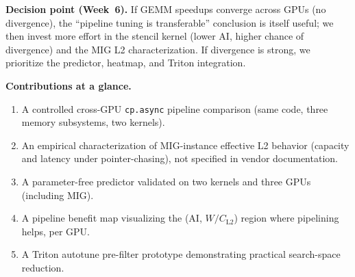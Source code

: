 \documentclass[sigplan,nonacm,10pt]{acmart}
\begin{document}
\smallskip
\noindent\textbf{Decision point (Week~6).}
If GEMM speedups converge across GPUs (no divergence), the
``pipeline tuning is transferable'' conclusion is itself useful; we
then invest more effort in the stencil kernel (lower AI, higher chance
of divergence) and the MIG L2 characterization.
If divergence is strong, we prioritize the predictor, heatmap, and
Triton integration.

\smallskip
\noindent\textbf{Contributions at a glance.}
\begin{enumerate}
\item A controlled cross-GPU \texttt{cp.async} pipeline comparison
      (same code, three memory subsystems, two kernels).
\item An empirical characterization of MIG-instance effective L2
      behavior (capacity and latency under pointer-chasing), not
      specified in vendor documentation.
\item A parameter-free predictor validated on two kernels and three GPUs
      (including MIG).
\item A pipeline benefit map visualizing the (AI, $W/C_{\text{L2}}$)
      region where pipelining helps, per GPU.
\item A Triton autotune pre-filter prototype demonstrating practical
      search-space reduction.
\end{enumerate}



\end{document}
